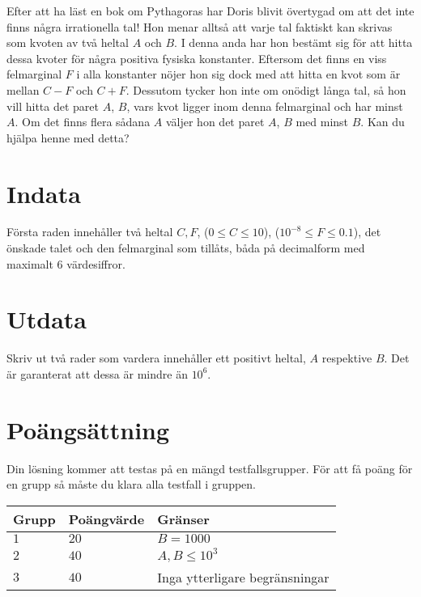 \noindent
Efter att ha läst en bok om Pythagoras har Doris blivit övertygad om att det inte finns några irrationella tal!
Hon menar alltså att varje tal faktiskt kan skrivas som kvoten av två heltal $A$ och $B$.
I denna anda har hon bestämt sig för att hitta dessa kvoter för några positiva fysiska konstanter.
Eftersom det finns en viss felmarginal $F$ i alla konstanter nöjer hon sig dock med att hitta en kvot som är mellan $C-F$ och $C+F$.
Dessutom tycker hon inte om onödigt långa tal, så hon vill hitta det paret $A$, $B$, vars kvot ligger inom denna felmarginal och har minst $A$. Om det finns flera sådana $A$ väljer hon det paret $A$, $B$ med minst $B$.
Kan du hjälpa henne med detta?

\section*{Indata}
\noindent
Första raden innehåller två heltal $C, F$, ($0 \leq C \leq 10$), ($10^{-8} \leq F \leq 0.1$), det önskade talet och den felmarginal som tillåts, båda på decimalform med maximalt 6 värdesiffror.

\section*{Utdata}
\noindent
Skriv ut två rader som vardera innehåller ett positivt heltal, $A$ respektive $B$. Det är garanterat att dessa är mindre än $10^6$.

\section*{Poängsättning}
\noindent
Din lösning kommer att testas på en mängd testfallsgrupper.
För att få poäng för en grupp så måste du klara alla testfall i gruppen.

\noindent
\begin{tabular}{| l | l | l |}
\hline
  Grupp & Poängvärde & Gränser \\ \hline
  $1$    & $20$       &  $B = 1000$ \\ \hline 
  $2$    & $40$       &  $A, B \leq 10^{3}$ \\ \hline
  $3$    & $40$       &  Inga ytterligare begränsningar \\ \hline
\end{tabular}
